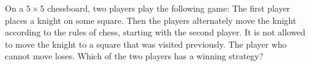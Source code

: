 On a $5\times 5$ chessboard, two players play the following game: The first player places a knight on some square. Then the players alternately move the knight according to the rules of chess, starting with the second player. It is not allowed to move the knight to a square that was visited previously. The player who cannot move loses. Which of the two players has a winning strategy?